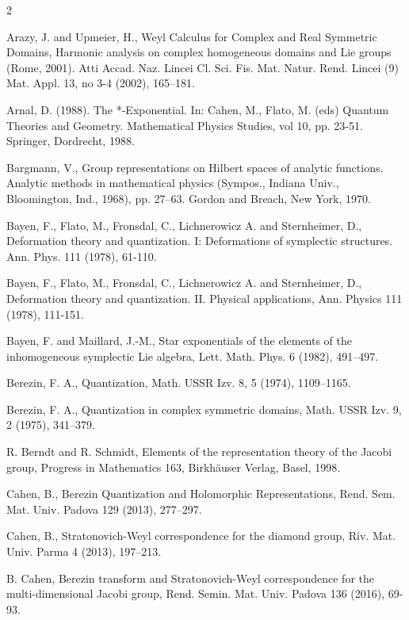 \documentclass[12pt]{amsart}
\numberwithin{equation}{section}
\begin{document}
\begin{thebibliography}{2}


 Arazy, J. and Upmeier, H., Weyl Calculus for
Complex and Real Symmetric Domains, Harmonic analysis on complex
homogeneous domains and Lie groups (Rome, 2001). Atti Accad. Naz.
Lincei Cl. Sci. Fis. Mat. Natur. Rend. Lincei (9) Mat. Appl. 13, no
3-4 (2002), 165--181.

 Arnal, D. (1988). The *-Exponential. In: Cahen, M., Flato, M. (eds) Quantum Theories and Geometry. Mathematical Physics Studies, vol 10, pp. 23-51. Springer, Dordrecht, 1988.

 Bargmann, V., Group representations on Hilbert spaces of analytic functions. Analytic methods in mathematical physics (Sympos., Indiana Univ., Bloomington, Ind., 1968), pp. 27--63. Gordon and Breach, New York, 1970.

 Bayen, F., Flato, M., Fronsdal, C., Lichnerowicz A. and Sternheimer, D., Deformation theory and quantization. I: Deformations of symplectic structures. 
Ann. Phys. 111 (1978),  61-110.

 Bayen, F., Flato, M., Fronsdal, C., Lichnerowicz A. and Sternheimer, D., Deformation theory and quantization. II. Physical applications, Ann. Physics 111 (1978),  111-151.

 Bayen, F. and Maillard, J.-M., Star exponentials of the elements of the inhomogeneous symplectic Lie algebra, Lett. Math. Phys. 6 (1982), 491--497.

 Berezin, F. A., Quantization, Math. USSR Izv. 8, 5
(1974), 1109--1165.

 Berezin, F. A., Quantization in complex symmetric
domains, Math. USSR Izv. 9, 2 (1975), 341--379.

 R. Berndt and R. Schmidt, Elements of the
representation theory of the Jacobi group, Progress in Mathematics
163, Birkh\"auser Verlag, Basel, 1998.

 Cahen, B., Berezin Quantization and Holomorphic Representations,
Rend. Sem. Mat. Univ. Padova 129 (2013), 277--297.

 Cahen, B., Stratonovich-Weyl correspondence for
the diamond group, Riv. Mat. Univ. Parma 4 (2013), 197--213.

 B. Cahen, Berezin transform and Stratonovich-Weyl correspondence for the multi-dimensional Jacobi group,
Rend. Semin. Mat. Univ. Padova 136 (2016), 69-93.


\end{thebibliography}
\end{document}
